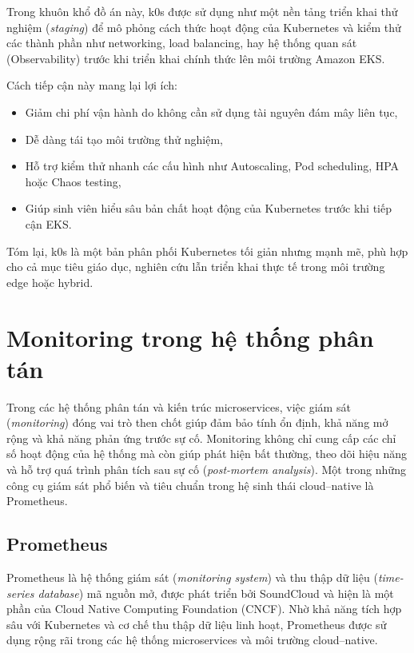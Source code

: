 Trong khuôn khổ đồ án này, k0s được sử dụng như một nền tảng triển khai thử nghiệm (\textit{staging}) 
để mô phỏng cách thức hoạt động của Kubernetes và kiểm thử các thành phần như networking, load balancing, hay hệ thống quan sát (Observability) trước khi triển khai chính thức lên môi trường Amazon EKS.  

Cách tiếp cận này mang lại lợi ích:

\begin{itemize}
    \item Giảm chi phí vận hành do không cần sử dụng tài nguyên đám mây liên tục,
    \item Dễ dàng tái tạo môi trường thử nghiệm,
    \item Hỗ trợ kiểm thử nhanh các cấu hình như Autoscaling, Pod scheduling, HPA hoặc Chaos testing,
    \item Giúp sinh viên hiểu sâu bản chất hoạt động của Kubernetes trước khi tiếp cận EKS.
\end{itemize}

Tóm lại, k0s là một bản phân phối Kubernetes tối giản nhưng mạnh mẽ, phù hợp cho cả mục tiêu giáo dục, 
nghiên cứu lẫn triển khai thực tế trong môi trường edge hoặc hybrid.

\clearpage


\section{Monitoring trong hệ thống phân tán}

Trong các hệ thống phân tán và kiến trúc microservices, việc giám sát 
(\textit{monitoring}) đóng vai trò then chốt giúp đảm bảo tính ổn định, 
khả năng mở rộng và khả năng phản ứng trước sự cố. Monitoring không chỉ cung cấp 
các chỉ số hoạt động của hệ thống mà còn giúp phát hiện bất thường, theo dõi 
hiệu năng và hỗ trợ quá trình phân tích sau sự cố (\textit{post-mortem analysis}).  
Một trong những công cụ giám sát phổ biến và tiêu chuẩn trong hệ sinh thái 
cloud–native là Prometheus.

\subsection{Prometheus}

Prometheus là hệ thống giám sát (\textit{monitoring system}) và thu thập dữ liệu 
(\textit{time-series database}) mã nguồn mở, được phát triển bởi SoundCloud 
và hiện là một phần của Cloud Native Computing Foundation (CNCF). Nhờ khả năng 
tích hợp sâu với Kubernetes và cơ chế thu thập dữ liệu linh hoạt, Prometheus được 
sử dụng rộng rãi trong các hệ thống microservices và môi trường cloud–native.

